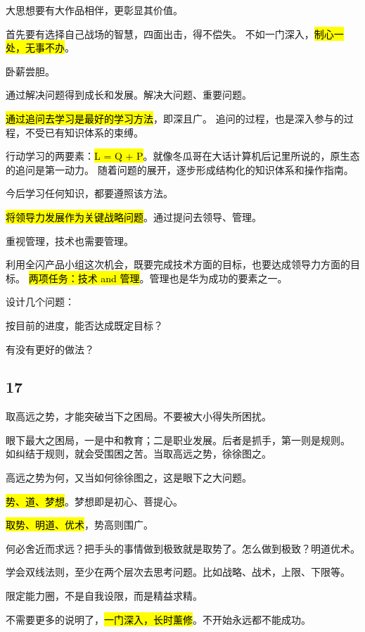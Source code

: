大思想要有大作品相伴，更彰显其价值。

首先要有选择自己战场的智慧，四面出击，得不偿失。
不如一门深入，\hl{制心一处，无事不办}。

卧薪尝胆。

通过解决问题得到成长和发展。解决大问题、重要问题。

\hl{通过追问去学习是最好的学习方法}，即深且广。
追问的过程，也是深入参与的过程，不受已有知识体系的束缚。

行动学习的两要素：\hl{L = Q + P}。就像冬瓜哥在大话计算机后记里所说的，原生态的追问是第一动力。
随着问题的展开，逐步形成结构化的知识体系和操作指南。

今后学习任何知识，都要遵照该方法。

\hrulefill

\hl{将领导力发展作为关键战略问题}。通过提问去领导、管理。

重视管理，技术也需要管理。

利用全闪产品小组这次机会，既要完成技术方面的目标，也要达成领导力方面的目标。
\hl{两项任务：技术 and 管理}。管理也是华为成功的要素之一。

设计几个问题：
\begin{enumbox}
\item 按目前的进度，能否达成既定目标？
\item 有没有更好的做法？
\end{enumbox}

\subsection{17}

取高远之势，才能突破当下之困局。不要被大小得失所困扰。

眼下最大之困局，一是中和教育；二是职业发展。后者是抓手，第一则是规则。
如纠结于规则，就会受围困之苦。当取高远之势，徐徐图之。

高远之势为何，又当如何徐徐图之，这是眼下之大问题。

\hl{势、道、梦想}。梦想即是初心、菩提心。

\hrulefill

\hl{取势、明道、优术}，势高则围广。

何必舍近而求远？把手头的事情做到极致就是取势了。怎么做到极致？明道优术。

学会双线法则，至少在两个层次去思考问题。比如战略、战术，上限、下限等。

限定能力圈，不是自我设限，而是精益求精。

不需要更多的说明了，\hl{一门深入，长时薰修}。不开始永远都不能成功。

